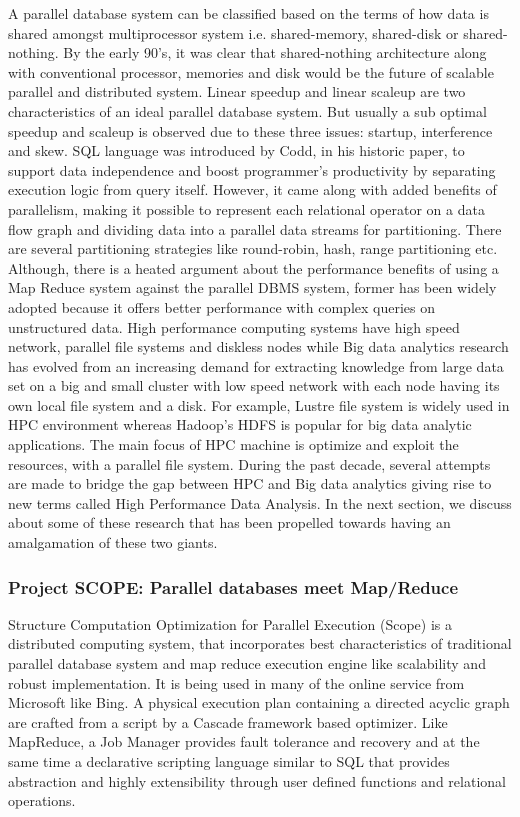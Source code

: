 \documentclass[runningheads,a4paper]{llncs}
\begin{document}
{A parallel database system can be classified based on the terms of how data is shared amongst multiprocessor system i.e. shared-memory, shared-disk or shared-nothing. By the early 90's, it was clear that shared-nothing architecture along with conventional processor, memories and disk would be the future of scalable parallel and distributed system. Linear speedup and linear scaleup are two characteristics of an ideal parallel database system. But usually a sub optimal speedup and scaleup is observed due to these three issues: startup, interference and skew. SQL language was introduced by Codd, in his historic paper, to support data independence and boost programmer's productivity by separating execution logic from query itself. However, it came along with added benefits of parallelism, making it possible to represent each relational operator on a data flow graph and dividing data into a parallel data streams for partitioning. There are several partitioning strategies like round-robin, hash, range partitioning etc. \\

Although, there is a heated argument about the performance benefits of using a Map Reduce system against the parallel DBMS system, former has been widely adopted because it offers better performance with complex queries on unstructured data. High performance computing systems have high speed network, parallel file systems and diskless nodes while Big data analytics research has evolved from an increasing demand for extracting knowledge from large data set on a big and small cluster with low speed network with each node having its own local file system and a disk. For example, Lustre file system is widely used in HPC environment whereas Hadoop's HDFS is popular for big data analytic applications. The main focus of HPC machine is optimize and exploit the resources, with a parallel file system. During the past decade, several attempts are made to bridge the gap between HPC and Big data analytics giving rise to new terms called High Performance Data Analysis. In the next section, we discuss about some of these research that has been propelled towards having an amalgamation of these two giants.\\

\subsubsection{Project SCOPE: Parallel databases meet Map/Reduce}
Structure Computation Optimization for Parallel Execution (Scope) is a distributed computing system, that incorporates best characteristics of traditional parallel database system and map reduce execution engine like scalability and robust implementation. It is being used in many of the online service from Microsoft like Bing. A physical execution plan containing a directed acyclic graph are crafted from a script by a Cascade framework based optimizer.  Like MapReduce, a Job Manager provides fault tolerance and recovery and at the same time a declarative scripting language similar to SQL that provides abstraction and highly extensibility through user defined functions and relational operations.\\

}
\end{document}
